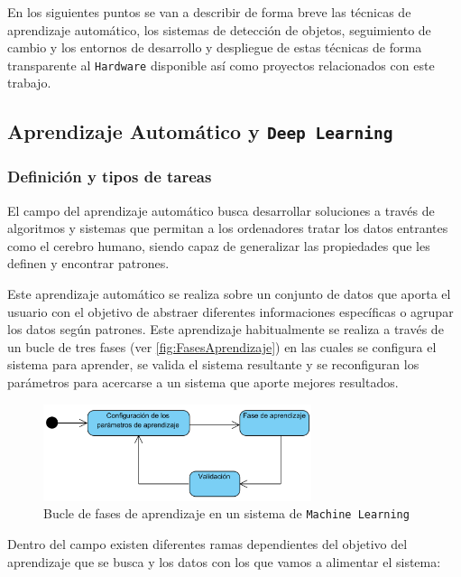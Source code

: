 En los siguientes puntos se van a describir de forma breve las técnicas de aprendizaje automático, los sistemas de detección de objetos, seguimiento de cambio y los entornos de desarrollo y despliegue 
de estas técnicas de forma transparente al \texttt{Hardware} disponible así como proyectos relacionados con este trabajo.
\clearpage

\subsection{Aprendizaje Automático y \texttt{Deep Learning}}

\subsubsection{Definición y tipos de tareas}

El campo del aprendizaje automático busca desarrollar soluciones a través de algoritmos y sistemas que permitan a los ordenadores tratar los datos entrantes como el cerebro humano, siendo capaz de 
generalizar las propiedades que les definen y encontrar patrones.

Este aprendizaje automático se realiza sobre un conjunto de datos que aporta el usuario con el objetivo de abstraer diferentes informaciones específicas o agrupar los datos según patrones. Este aprendizaje 
habitualmente se realiza a través de un bucle de tres fases (ver \autoref{fig:FasesAprendizaje}) en las cuales se configura el sistema para aprender, se valida el sistema resultante y se reconfiguran los parámetros para acercarse a un sistema 
que aporte mejores resultados.

\begin{figure}[H]
    \centering
    \includegraphics[width=0.7\textwidth]{images/4/Fases.png}
    \caption{Bucle de fases de aprendizaje en un sistema de \texttt{Machine Learning}}
    \label{fig:FasesAprendizaje}
\end{figure}

Dentro del campo existen diferentes ramas dependientes del objetivo del aprendizaje que se busca y los datos con los que vamos a alimentar el sistema:

